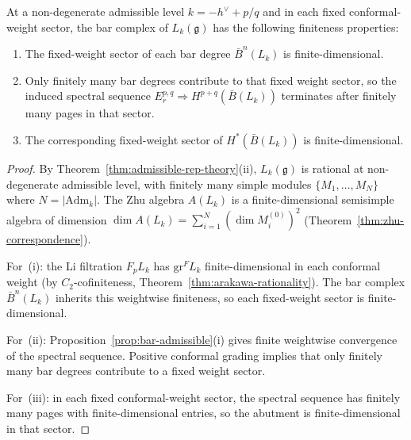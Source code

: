 \begin{corollary}
\label{cor:bar-admissible-finiteness}
At a non-degenerate admissible level $k = -h^\vee + p/q$ and in
each fixed conformal-weight sector, the bar complex of
$L_k(\mathfrak{g})$ has the following finiteness properties:
\begin{enumerate}[label=\textup{(\roman*)}]
\item The fixed-weight sector of each bar degree $\bar{B}^n(L_k)$
 is finite-dimensional.
\item Only finitely many bar degrees contribute to that fixed
 weight sector, so the induced spectral sequence
 $E_r^{p,q} \Rightarrow H^{p+q}(\bar{B}(L_k))$ terminates after
 finitely many pages in that sector.
\item The corresponding fixed-weight sector of
 $H^*(\bar{B}(L_k))$ is finite-dimensional.
\end{enumerate}
\end{corollary}

\begin{proof}
By Theorem~\ref{thm:admissible-rep-theory}(ii), $L_k(\mathfrak{g})$ is rational at non-degenerate admissible level, with finitely many simple modules $\{M_1, \ldots, M_N\}$ where $N = |\mathrm{Adm}_k|$. The Zhu algebra $A(L_k)$ is a finite-dimensional semisimple algebra of dimension $\dim A(L_k) = \sum_{i=1}^N (\dim M_i^{(0)})^2$ (Theorem~\ref{thm:zhu-correspondence}).

For~(i): the Li filtration $F_p L_k$ has $\mathrm{gr}^F L_k$
finite-dimensional in each conformal weight
\textup{(}by $C_2$-cofiniteness,
Theorem~\ref{thm:arakawa-rationality}\textup{)}. The bar
complex $\bar{B}^n(L_k)$ inherits this weightwise finiteness,
so each fixed-weight sector is finite-dimensional.

For~(ii): Proposition~\ref{prop:bar-admissible}(i) gives finite
weightwise convergence of the spectral sequence. Positive
conformal grading implies that only finitely many bar degrees
contribute to a fixed weight sector.

For~(iii): in each fixed conformal-weight sector, the spectral
sequence has finitely many pages with finite-dimensional entries,
so the abutment is finite-dimensional in that sector.
\end{proof}

